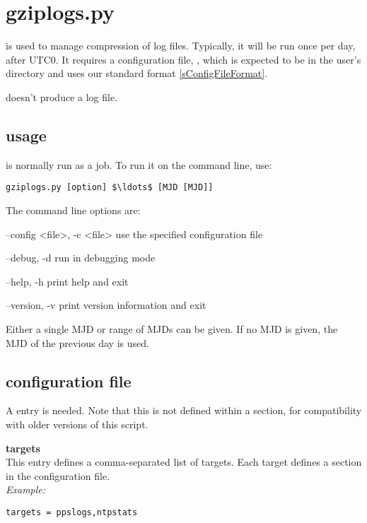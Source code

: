 \section{gziplogs.py \label{s:gziplogs}}

 is used to manage compression of log files. 
Typically, it will be run once per day, after UTC0. It requires 
a configuration file, , which is expected to be
in the user's  directory and uses our standard format \ref{sConfigFileFormat}.

 doesn't produce a log file.

\subsection{usage}

 is normally run as a  job. To run it on the command line, use:
\begin{lstlisting}[mathescape=true]
gziplogs.py [option] $\ldots$ [MJD [MJD]]
\end{lstlisting}
The command line options are:
\begin{description*}
	\item[--config \textless{file}\textgreater, -c \textless{file}\textgreater] use the specified configuration file
	\item[--debug, -d]	run in debugging mode
	\item[--help, -h]	print help and exit
	\item[--version, -v]	print version information and exit
\end{description*}

Either a single MJD or range of MJDs can be given. 
If no MJD is given, the MJD of the previous day is used.

\subsection{configuration file}

A  entry is needed. Note that this is not defined within a section, for compatibility with older versions of this script.

{\bfseries targets}\\
This entry defines a comma-separated list of targets. 
Each target defines a section in the configuration file.\\
\textit{Example:}
\begin{lstlisting}
targets = ppslogs,ntpstats
\end{lstlisting}


